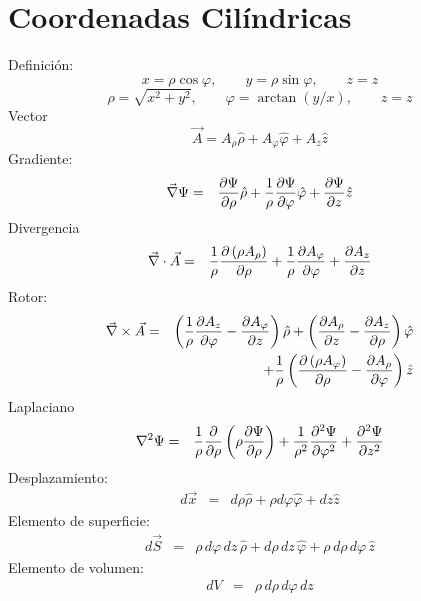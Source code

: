 \section{Coordenadas Cilíndricas}
Definición:
\begin{equation}
    x  =  \rho\cos\varphi , \qquad
    y  =  \rho\sin\varphi , \qquad
    z =  z
\end{equation}
\begin{equation}
    \rho  =  \sqrt{x^2 + y^2} , \qquad
    \varphi  = \arctan{(y/x)}, \qquad
     z=  z
\end{equation}
Vector
\begin{equation}
\vec{A} =A_\rho {\hat \rho} + A_\varphi {\hat \varphi} +
A_z {\hat z}
\end{equation}
Gradiente:
\begin{eqnarray}
 \vec\nabla\Psi&=&{\partial\Psi\over \partial \rho} {\hat \rho}
  + {1 \over \rho}{\partial\Psi\over \partial \varphi} {\hat \varphi}
  + {\partial\Psi\over \partial z} {\hat z}
\end{eqnarray}
Divergencia
\begin{eqnarray}
 \vec\nabla \cdot \vec{A}
&=&  {1 \over \rho}{\partial \left( \rho A_\rho  \right) \over \partial
\rho}  + {1 \over \rho}{\partial A_\varphi \over \partial \varphi}
  + {\partial A_z \over \partial z}
\end{eqnarray}
Rotor:
\begin{eqnarray}
\vec\nabla \times  \vec{A}
&=&   \left({1 \over \rho}{\partial A_z \over \partial \varphi}
    - {\partial A_\varphi \over \partial z}\right)  {\hat \rho} +
\left({\partial A_\rho \over \partial z} - {\partial A_z \over
\partial \rho}\right)  {\hat \varphi} \nonumber\\
&&+  {1 \over \rho}\left({\partial \left( \rho A_\varphi \right) \over
\partial \rho}     - {\partial A_\rho \over \partial \varphi}\right) {\hat z}
\end{eqnarray}
Laplaciano
\begin{eqnarray}
 \nabla^2 \Psi
&=& {1 \over \rho}{\partial \over \partial \rho}\left(\rho {\partial\Psi\over
\partial \rho}\right)
  + {1 \over \rho^2}{\partial^2\Psi\over \partial \varphi^2}
  + {\partial^2\Psi\over \partial z^2} \\
\end{eqnarray}
Desplazamiento:
\begin{eqnarray}
 d \vec{x}
 &=& d\rho {\hat \rho} + \rho d\varphi {\hat \varphi} +dz {\hat z}
\end{eqnarray}
Elemento de superficie:
\begin{eqnarray}
 d \vec{S}
&=& \rho\, d\varphi\, dz\, {\hat \rho} + d\rho
\,dz\, {\hat \varphi} +  \rho \,d\rho\, d\varphi \, {\hat z}
\end{eqnarray}
Elemento de volumen:
\begin{eqnarray}
 dV
 &=& \rho\, d\rho\, d\varphi\, dz
\end{eqnarray}

